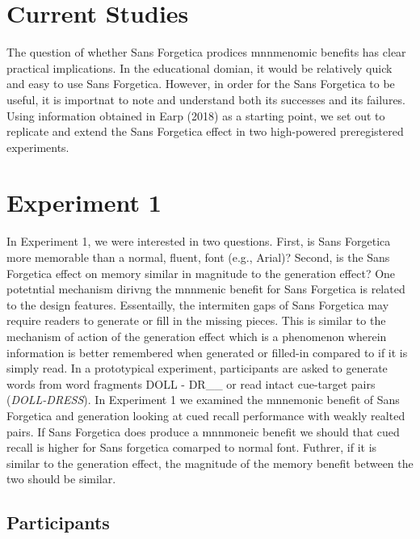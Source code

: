 \documentclass[pdf]{apa6}
\begin{document}
\hypertarget{current-studies}{%
\section{Current Studies}\label{current-studies}}

The question of whether Sans Forgetica prodices mnnmenomic benefits has clear practical implications. In the educational domian, it would be relatively quick and easy to use Sans Forgetica. However, in order for the Sans Forgetica to be useful, it is importnat to note and understand both its successes and its failures. Using information obtained in Earp (2018) as a starting point, we set out to replicate and extend the Sans Forgetica effect in two high-powered preregistered experiments.

\hypertarget{experiment-1}{%
\section{Experiment 1}\label{experiment-1}}

In Experiment 1, we were interested in two questions. First, is Sans Forgetica more memorable than a normal, fluent, font (e.g., Arial)? Second, is the Sans Forgetica effect on memory similar in magnitude to the generation effect? One potetntial mechanism dirivng the mnnmenic benefit for Sans Forgetica is related to the design features. Essentailly, the intermiten gaps of Sans Forgetica may require readers to generate or fill in the missing pieces. This is similar to the mechanism of action of the generation effect which is a phenomenon wherein information is better remembered when generated or filled-in compared to if it is simply read. In a prototypical experiment, participants are asked to generate words from word fragments DOLL - DR\_\_ or read intact cue-target pairs (\emph{DOLL-DRESS}). In Experiment 1 we examined the mnnemonic benefit of Sans Forgetica and generation looking at cued recall performance with weakly realted pairs. If Sans Forgetica does produce a mnnmoneic benefit we should that cued recall is higher for Sans forgetica comarped to normal font. Futhrer, if it is similar to the generation effect, the magnitude of the memory benefit between the two should be similar.

\hypertarget{participants}{%
\subsection{Participants}\label{participants}}
\end{document}
